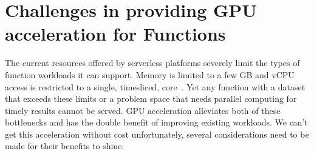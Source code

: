 \section{Challenges in providing GPU acceleration for Functions}
\label{sec:motiv}

The current resources offered by serverless platforms severely limit the types of function workloads it can support.
Memory is limited to a few GB and vCPU access is restricted to a single, timesliced, core~\cite{lambda-limits}.
Yet any function with a dataset that exceeds these limits or a problem space that needs parallel computing for timely results cannot be served.
GPU acceleration alleviates both of these bottlenecks and has the double benefit of improving existing workloads. 
We can't get this acceleration without cost unfortunately, several considerations need to be made for their benefits to shine.


